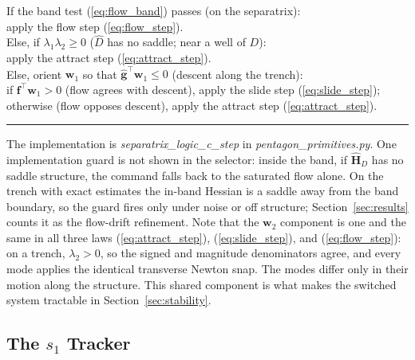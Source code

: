 \documentclass[lettersize,journal]{IEEEtran}
\begin{document}
\vspace{3pt}
\noindent If the band test (\ref{eq:flow_band}) passes (on the
separatrix):\\
\hspace*{1.5em} apply the flow step (\ref{eq:flow_step}).\\
Else, if $\lambda_1 \lambda_2 \geq 0$ ($\hat{D}$ has no saddle; near a
well of $D$):\\
\hspace*{1.5em} apply the attract step (\ref{eq:attract_step}).\\
Else, orient $\mathbf{w}_1$ so that $\hat{\mathbf{g}}^\top \mathbf{w}_1
\leq 0$ (descent along the trench):\\
\hspace*{1.5em} if $\mathbf{f}^\top \mathbf{w}_1 > 0$ (flow agrees with
descent), apply the slide step (\ref{eq:slide_step});\\
\hspace*{1.5em} otherwise (flow opposes descent), apply the attract
step (\ref{eq:attract_step}).
\vspace{4pt}
\hrule
\vspace{4pt}

The implementation is \textit{separatrix\_logic\_c\_step} in
\textit{pentagon\_primitives.py}. One implementation guard is not shown
in the selector: inside the band, if $\hat{\mathbf{H}}_D$ has no saddle
structure, the command falls back to the saturated flow alone. On the
trench with exact estimates the in-band Hessian is a saddle away from
the band boundary, so the guard fires only under noise or off
structure; Section~\ref{sec:results} counts it as the flow-drift
refinement. Note that the $\mathbf{w}_2$
component is one and the same in all three laws
(\ref{eq:attract_step}), (\ref{eq:slide_step}), and
(\ref{eq:flow_step}): on a trench, $\lambda_2 > 0$, so the signed and
magnitude denominators agree, and every mode applies the identical
transverse Newton snap. The modes differ only in their motion along the
structure. This shared component is what makes the switched system
tractable in Section~\ref{sec:stability}.

\subsection{The $s_1$ Tracker}
\label{sec:oecs_controller}
\end{document}
